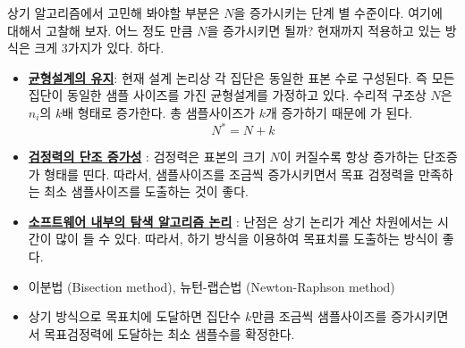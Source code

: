 \noindent
상기 알고리즘에서 고민해 봐야할 부분은 $N$을 증가시키는 단계 별 수준이다. 여기에 대해서 고찰해 보자. 어느 정도 만큼 $N$을 증가시키면 될까? 현재까지 적용하고 있는 방식은 크게 3가지가 있다. 하다. 
\begin{itemize}[leftmargin=2.5em]
    \item[(1)] \uline{\textbf{균형설계의 유지}}: 현재 설계 논리상 각 집단은 동일한 표본 수로 구성된다. 즉 모든 집단이 동일한 샘플 사이즈를 가진 균형설계를 가정하고 있다. 수리적 구조상 $N$은 $n_i$의 $k$배 형태로 증가한다. 총 샘플사이즈가 $k$개 증가하기 때문에 가 된다. 
        \begin{equation*}
            N^* = N + k
        \end{equation*}
    \item[(2)] \uline{\textbf{검정력의 단조 증가성}} : 검정력은 표본의 크기 $N$이 커질수록 항상 증가하는 단조증가 형태를 띤다. 따라서, 샘플사이즈를 조금씩 증가시키면서 목표 검정력을 만족하는 최소 샘플사이즈를 도출하는 것이 좋다. 
    \item[(3)] \uline{\textbf{소프트웨어 내부의 탐색 알고리즘 논리}} : 난점은 상기 논리가 계산 차원에서는 시간이 많이 들 수 있다. 따라서, 하기 방식을 이용하여 목표치를 도출하는 방식이 좋다. 
\end{itemize}

\begin{tcolorbox}[arc=4mm, colback=blue!5, colframe=black, boxrule=0.1 mm]
    \begin{itemize}[leftmargin = 1em, nosep]
        \item 이분법 (Bisection method), 뉴턴-랩슨법 (Newton-Raphson method)
        \item 상기 방식으로 목표치에 도달하면 집단수 $k$만큼 조금씩 샘플사이즈를 증가시키면서 목표검정력에 도달하는 최소 샘플수를 확정한다. 
    \end{itemize}
\end{tcolorbox}
